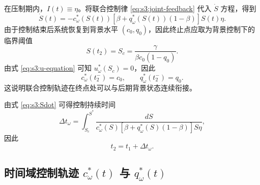 在压制期内，$I(t)\equiv\eta$。将联合控制律 \eqref{eq:s3:joint-feedback} 代入 $\dot S$ 方程，得到
\begin{equation}
\dot S(t)
=
-c_\omega^*(S(t))
\left[
\beta+q_\omega^*(S(t))(1-\beta)
\right]S(t)\eta.
\label{eq:s3:Sdot}
\end{equation}
由于控制结束后系统恢复到背景水平 $(c_0,q_0)$，因此终止点应取为背景控制下的临界阈值
\begin{equation}
S(t_2)=S_c=\frac{\gamma}{\beta c_0(1-q_0)}.
\label{eq:s3:terminal}
\end{equation}
由式 \eqref{eq:s3:u-equation} 可知 $u_\omega^*(S_c)=0$，因此
\begin{equation}
c_\omega^*(t_2^-)=c_0,\qquad
q_\omega^*(t_2^-)=q_0.
\end{equation}
这说明联合控制轨迹在终点处可以与后期背景状态连续衔接。

由式 \eqref{eq:s3:Sdot} 可得控制持续时间
\begin{equation}
\Delta t_\omega
=
\int_{S_c}^{S^*}
\frac{dS}
{
c_\omega^*(S)
\left[
\beta+q_\omega^*(S)(1-\beta)
\right]S\eta
},
\label{eq:s3:delta-t}
\end{equation}
因此
\begin{equation}
t_2=t_1+\Delta t_\omega.
\label{eq:s3:t2}
\end{equation}

\subsection{时间域控制轨迹 $c_\omega^*(t)$ 与 $q_\omega^*(t)$}

